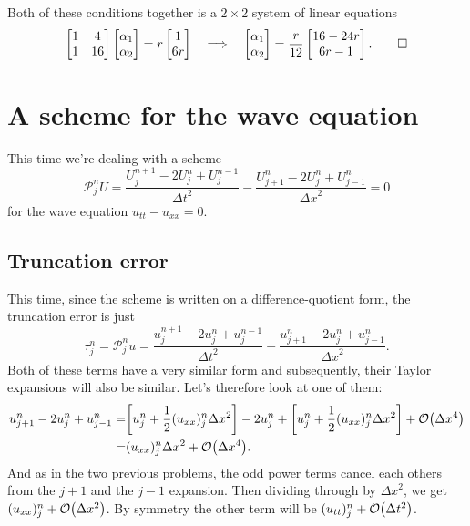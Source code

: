 \documentclass[11pt,letter, swedish, english
]{article}
\newcommand{\Dx}{\ensuremath{\Delta{x}}}
\newcommand{\Dt}{\ensuremath{\Delta{t}}}
\begin{document}
Both of these conditions together is a $2\times2$ system of linear
equations 
\begin{equation}
\begin{bmatrix}1&4\\1&16\end{bmatrix}
\begin{bmatrix}\alpha_1\\\alpha_2\end{bmatrix}
=r\begin{bmatrix}1\\6r\end{bmatrix}
\quad\Longrightarrow\quad
\begin{bmatrix}\alpha_1\\\alpha_2\end{bmatrix}
=\frac{r}{12}\begin{bmatrix*}[c]
16-24r\\6r-1
\end{bmatrix*}.
\qed
\end{equation}


\section{A scheme for the wave equation}
This time we're dealing with a scheme
\begin{equation}\label{eq:3_start}
\mathcal{P}_j^nU=\frac{U_j^{n+1}-2U_j^{n}+U_j^{n-1}}{\Dt^2}
-\frac{U_{j+1}^{n}-2U_j^{n}+U_{j-1}^{n}}{\Dx^2}=0
\end{equation}
for the wave equation $u_{tt}-u_{xx}=0$.

\subsection{Truncation error}
This time, since the scheme is written on a difference-quotient form,
the truncation error is just
\begin{equation}
\tau_j^n=\mathcal{P}_j^nu
=\frac{u_j^{n+1}-2u_j^{n}+u_j^{n-1}}{\Dt^2}
-\frac{u_{j+1}^{n}-2u_j^{n}+u_{j-1}^{n}}{\Dx^2}.
\end{equation}
Both of these terms have a very similar form and subsequently, their
Taylor expansions will also be similar. Let's therefore look at one of
them:
\begin{equation}
\begin{aligned}
u_{j+1}^{n}-2u_j^{n}+u_{j-1}^{n}=&
\qty[u_j^n+\frac{1}{2}(u_{xx})_j^n\Dx^2]-2u_j^n
+\qty[u_j^n+\frac{1}{2}(u_{xx})_j^n\Dx^2]+\order{\Dx^4}\\
=&(u_{xx})_j^n\Dx^2+\order{\Dx^4}.
\end{aligned}
\end{equation}
And as in the two previous problems, the odd power terms cancel each
others from the $j+1$ and the $j-1$ expansion. Then dividing through
by $\Dx^2$, we get $(u_{xx})_j^n+\order{\Dx^2}$.
By symmetry the other term will be $(u_{tt})_j^n+\order{\Dt^2}$.
\end{document}
